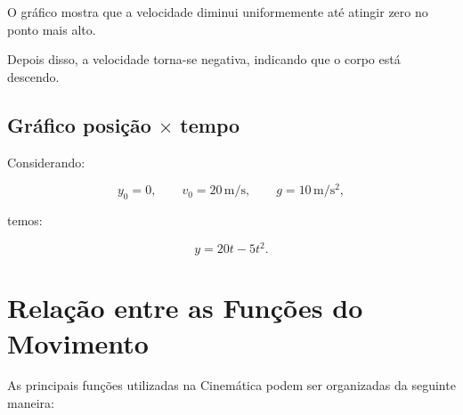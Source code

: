 \documentclass[a4paper,12pt]{article}
\begin{document}
O gráfico mostra que a velocidade diminui uniformemente até atingir
zero no ponto mais alto.

Depois disso, a velocidade torna-se negativa, indicando que o corpo
está descendo.


\subsection{Gráfico posição $\times$ tempo}

Considerando:

\[
y_0=0,
\qquad
v_0=20\,\mathrm{m/s},
\qquad
g=10\,\mathrm{m/s^2},
\]

temos:

\[
y=20t-5t^2.
\]

\begin{center}


\end{center}


\section{Relação entre as Funções do Movimento}

As principais funções utilizadas na Cinemática podem ser organizadas
da seguinte maneira:
\end{document}
